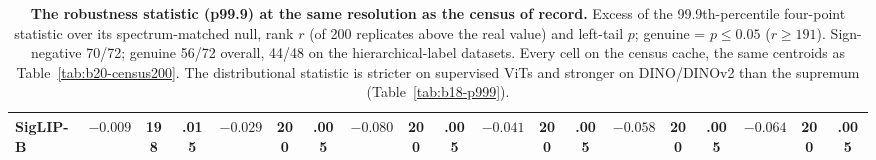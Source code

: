 \begin{table}[H]
\begin{tabular}{lcccccccccccccccccc}
SigLIP-B & $-0.009$ & 198 & .015 & $-0.029$ & 200 & .005 & $-0.080$ & 200 & .005 & $-0.041$ & 200 & .005 & $-0.058$ & 200 & .005 & $-0.064$ & 200 & .005 \\
\bottomrule
\end{tabular}
\caption{\textbf{The robustness statistic (p99.9) at the same resolution as the census of record.} Excess of the 99.9th-percentile four-point statistic over its spectrum-matched null, rank $r$ (of 200 replicates above the real value) and left-tail $p$; genuine = $p\le0.05$ ($r\ge191$). Sign-negative 70/72; genuine 56/72 overall, 44/48 on the hierarchical-label datasets. Every cell on the census cache, the same centroids as Table~\ref{tab:b20-census200}. The distributional statistic is stricter on supervised ViTs and stronger on DINO/DINOv2 than the supremum (Table~\ref{tab:b18-p999}).}
\label{tab:b21-p999census}
\end{table}
